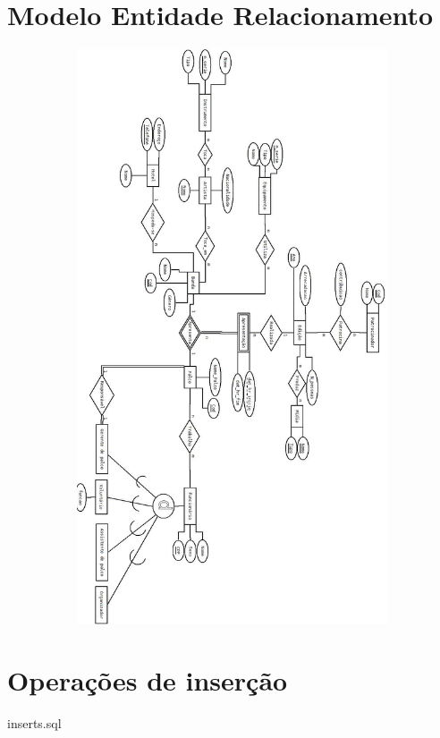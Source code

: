 \documentclass[12pt]{article}
\begin{document}
\section{Modelo Entidade Relacionamento}
\begin{figure}[!htb]
 \raggedright
	\includegraphics[width=19cm,height=17cm,keepaspectratio]{Imagens/trabfinal.jpeg}
\end{figure}
\pagebreak

%
\pagebreak
\section{Operações de inserção}
{inserts.sql}

\pagebreak

 
\end{document}
